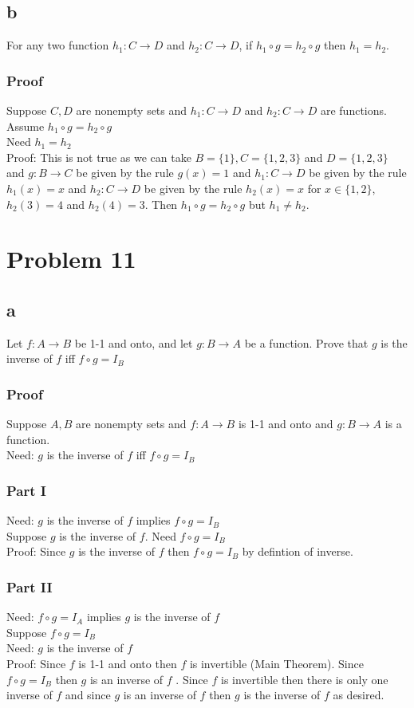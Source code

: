 \documentclass{article}
\begin{document}
\subsection*{b}
For any two function $h_1: C \rightarrow D $ and $h_2: C \rightarrow D$, if $h_1 \circ g = h_2 \circ g$ then $h_1 = h_2$.
\subsubsection*{Proof}
Suppose $C,D$ are nonempty sets and $h_1: C \rightarrow D $ and $h_2: C \rightarrow D$ are functions. \\
Assume $h_1 \circ g = h_2 \circ g$\\
Need $h_1 = h_2$\\
Proof: This is not true as we can take $B = \{1\}, C = \{1,2,3\}$ and $D = \{1, 2, 3\}$ and $g: B \rightarrow C$ be given by the rule $g(x) = 1$ and $h_1: C \rightarrow D$ be given by the rule $h_1(x) = x$ and $h_2: C \rightarrow D$ be given by the rule $h_2(x) = x $ for $x \in \{1,2\}$, $h_2(3) = 4 $ and $h_2(4) = 3 $. Then $h_1 \circ g = h_2 \circ g$ but $h_1 \neq h_2$. 

\section*{Problem 11}
\subsection*{a}
Let $f: A \rightarrow B$ be 1-1 and onto, and let $g: B \rightarrow A$ be a function. Prove that $g$ is the inverse of $f$ iff $f \circ g = I_B$
\subsubsection*{Proof}
Suppose $A,B$ are nonempty sets and $f: A \rightarrow B$ is 1-1 and onto and $g: B \rightarrow A$ is a function. \\
Need: $g$ is the inverse of $f$ iff $f \circ g = I_B$\\
\subsubsection*{Part I}
Need: $g$ is the inverse of $f$ implies $f \circ g = I_B$\\
Suppose $g$ is the inverse of $f$. 
Need $f \circ g = I_B$\\
Proof: Since $g$ is the inverse of $f$ then $f \circ g = I_B$ by defintion of inverse.
\subsubsection*{Part II}
Need: $f \circ g = I_A$ implies $g$ is the inverse of $f$\\
Suppose $f \circ g = I_B$\\
Need: $g$ is the inverse of $f$\\
Proof: Since $f$ is 1-1 and onto then $f$ is invertible (Main Theorem). Since $f \circ g = I_B$ then $g$ is an inverse of $f$ . Since $f$ is invertible then there is only one inverse of $f$ and since $g$ is an inverse of $f$ then $g$ is the inverse of $f$ as desired.
\end{document}
